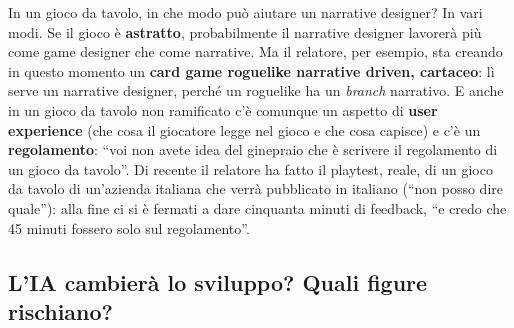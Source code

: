 In un gioco da tavolo, in che modo può aiutare un narrative designer? In vari
modi. Se il gioco è \textbf{astratto}, probabilmente il narrative designer
lavorerà più come game designer che come narrative. Ma il relatore, per
esempio, sta creando in questo momento un \textbf{card game roguelike
narrative driven, cartaceo}: lì serve un narrative designer, perché un
roguelike ha un \emph{branch} narrativo. E anche in un gioco da tavolo non
ramificato c'è comunque un aspetto di \textbf{user experience} (che cosa il
giocatore legge nel gioco e che cosa capisce) e c'è un \textbf{regolamento}:
``voi non avete idea del ginepraio che è scrivere il regolamento di un gioco
da tavolo''. Di recente il relatore ha fatto il playtest, reale, di un gioco
da tavolo di un'azienda italiana che verrà pubblicato in italiano (``non posso
dire quale''): alla fine ci si è fermati a dare cinquanta minuti di feedback,
``e credo che 45 minuti fossero solo sul regolamento''.

\subsection{L'IA cambierà lo sviluppo? Quali figure rischiano?}

